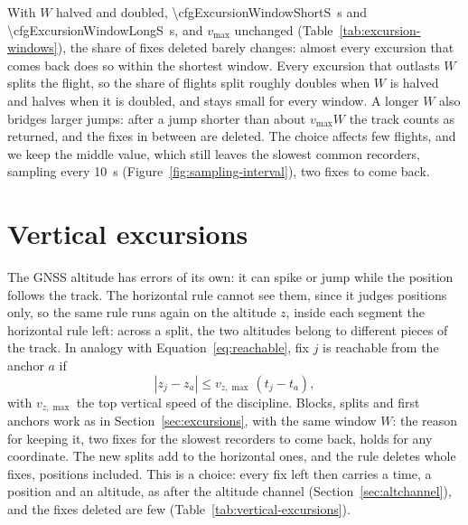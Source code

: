 With $W$ halved and doubled, \SI{\cfgExcursionWindowShortS}{\second} and
\SI{\cfgExcursionWindowLongS}{\second}, and $v_{\max}$ unchanged
(Table~\ref{tab:excursion-windows}), the share of fixes deleted barely changes: almost
every excursion that comes back does so within the shortest window. Every excursion that
outlasts $W$ splits the flight, so the share of flights split roughly doubles when $W$ is
halved and halves when it is doubled, and stays small for every window. A longer $W$ also
bridges larger jumps: after a jump shorter than about $v_{\max}W$ the track counts as
returned, and the fixes in between are deleted. The choice affects few flights, and we
keep the middle value, which still leaves the slowest common recorders, sampling every
\SI{10}{\second} (Figure~\ref{fig:sampling-interval}), two fixes to come back.

\begin{table}[htbp]
\centering\small
\caption{The excursion rule with the window $W=\SI{\cfgExcursionWindowS}{\second}$ and
with half and twice $W$, in the flights kept by the previous steps. Flights split: share
of the flights split at least once. Fixes deleted: share of the fixes the rule receives
that it deletes.}
\label{tab:excursion-windows}

\end{table}

\section{Vertical excursions}
\label{sec:vertical}

The GNSS altitude has errors of its own: it can spike or jump while the position follows
the track. The horizontal rule cannot see them, since it judges positions only, so the
same rule runs again on the altitude $z$, inside each segment the horizontal rule left:
across a split, the two altitudes belong to different pieces of the track. In analogy
with Equation~\eqref{eq:reachable}, fix $j$ is reachable from the anchor $a$ if
\begin{equation}
  |z_j-z_a|\leq v_{z,\max}\,(t_j-t_a),
  \label{eq:reachable-vertical}
\end{equation}
with $v_{z,\max}$ the top vertical speed of the discipline. Blocks, splits and first
anchors work as in Section~\ref{sec:excursions}, with the same window $W$: the reason for
keeping it, two fixes for the slowest recorders to come back, holds for any coordinate.
The new splits add to the horizontal ones, and the rule deletes whole fixes, positions
included. This is a choice: every fix left then carries a time, a position and an
altitude, as after the altitude channel (Section~\ref{sec:altchannel}), and the fixes
deleted are few (Table~\ref{tab:vertical-excursions}).

